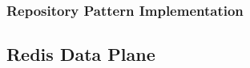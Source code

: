 \documentclass[a4paper,twoside]{sapthesis}
\begin{document}
\subsubsection{Repository Pattern Implementation}
%
%
%
%
%
%
%
%
%
%
%
%

\subsection{Redis Data Plane}
\end{document}
